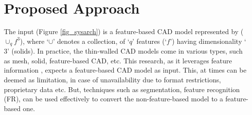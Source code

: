 \section{Proposed Approach}
\label{sec:approach}
The input  (Figure \ref{fig_sysarch}) is a feature-based CAD model represented by  ($\cup_qf^3$), where `$\cup$' denotes a collection, of `$q$' features (`$f$') having dimensionality `$3$' (solids). In practice, the thin-walled CAD models come in various types, such as mesh, solid, feature-based CAD, etc. This research, as it leverages feature information \cite{YogeshCOEP2013}, expects a feature-based CAD model as input. This, at times can be deemed as limitation, in case of unavailability due to format restrictions, proprietary data etc. But, techniques such as segmentation, feature recognition (FR), can be used effectively to convert the non-feature-based model to a feature-based one.

\smallskip

